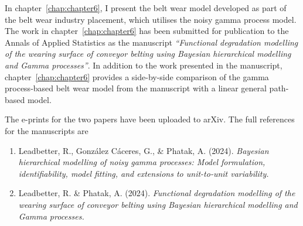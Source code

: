\documentclass[apa,colorlinks,emptypage]{curtinThesis}
\begin{document}
In chapter~\ref{chap:chapter6}, I present the belt wear model developed as part of the belt wear industry placement, which utilises the noisy gamma process model. The work in chapter~\ref{chap:chapter6} has been submitted for publication to the Annals of Applied Statistics as the manuscript \textit{``Functional degradation modelling of the wearing surface of conveyor belting using Bayesian hierarchical modelling and Gamma processes''}. In addition to the work presented in the manuscript, chapter~\ref{chap:chapter6} provides a side-by-side comparison of the gamma process-based belt wear model from the manuscript with a linear general path-based model.

The e-prints for the two papers have been uploaded to arXiv. The full references for the manuscripts are
\begin{enumerate}
  \item Leadbetter, R., Gonz\'{a}lez C\'{a}ceres, G., \& Phatak, A. (2024). \textit{Bayesian hierarchical modelling of noisy gamma processes: Model formulation, identifiability, model fitting, and extensions to unit-to-unit variability.}
  \item Leadbetter, R. \& Phatak, A. (2024). \textit{Functional degradation modelling of the wearing surface of conveyor belting using Bayesian hierarchical modelling and Gamma processes.}
\end{enumerate}







%
%


\backmatter{}

\ackstatement %
\end{document}
